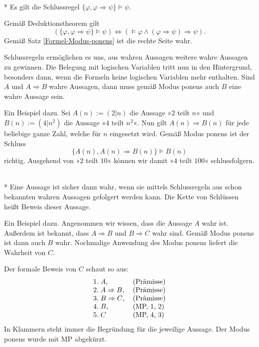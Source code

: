 \begin{Satz}\mbox{}\\*
Es gilt die Schlussregel $\{\varphi,\varphi\Rightarrow\psi\}\models\psi$.
\end{Satz}
 Gemäß Deduktionstheorem gilt
\[(\{\varphi,\varphi\Rightarrow\psi\}\models\psi)
\iff (\models \varphi\land(\varphi\Rightarrow\psi)\Rightarrow\psi).\]
Gemäß Satz \ref{Formel-Modus-ponens} ist die rechte
Seite wahr.\;\qedsymbol

Schlussregeln ermöglichen es uns, aus wahren Aussagen weitere
wahre Aussagen zu gewinnen. Die Belegung mit logischen Variablen
tritt nun in den Hintergrund, besonders dann, wenn die Formeln keine
logischen Variablen mehr enthalten. Sind $A$ und $A\Rightarrow B$
wahre Aussagen, dann muss gemäß Modus ponens auch $B$ eine wahre
Aussage sein.

Ein Beispiel dazu. Sei $A(n):=(2|n)$ die Aussage »$2$ teilt $n$«
und $B(n):=(4|n^2)$ die Aussage »$4$ teilt $n^2$«.
Nun gilt $A(n)\Rightarrow B(n)$ für jede beliebige ganze
Zahl, welche für $n$ eingesetzt wird. Gemäß Modus ponens ist der Schluss%
\[\{A(n), A(n)\Rightarrow B(n)\}\models B(n)\]
richtig. Ausgehend von »$2$ teilt $10$« können wir
damit »$4$ teilt $100$« schlussfolgern.

\begin{Definition}[Beweis]\mbox{}\\*
Eine Aussage ist sicher dann wahr, wenn sie mittels Schlussregeln
aus schon bekannten wahren Aussagen gefolgert werden kann. Die Kette
von Schlüssen heißt Beweis dieser Aussage.
\end{Definition}
Ein Beispiel dazu. Angenommen wir wissen, dass die Aussage $A$ wahr
ist. Außerdem ist bekannt, dass $A\Rightarrow B$ und $B\Rightarrow C$
wahr sind. Gemäß Modus ponens ist dann auch $B$ wahr. Nochmalige
Anwendung des Modus ponens liefert die Wahrheit von $C$.

Der formale Beweis von $C$ schaut so aus:
\[
\begin{tabular}{ll}
1.\;$A$, & (Prämisse)\\
2.\;$A\Rightarrow B$, & (Prämisse)\\
3.\;$B\Rightarrow C$, & (Prämisse)\\
4.\;$B$, & (MP, 1, 2)\\
5.\;$C$ & (MP, 4, 3)
\end{tabular}
\]
In Klammern steht immer die Begründung für die jeweilige Aussage.
Der Modus ponens wurde mit MP abgekürzt.

